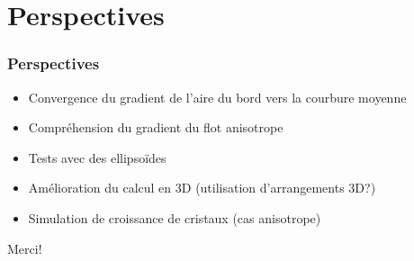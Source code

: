 \documentclass{beamer}
\begin{document}
\section{Perspectives}

\begin{frame}
    \frametitle{Perspectives}

    \begin{itemize}
        \item Convergence du gradient de l'aire du bord vers la courbure
            moyenne
        \item Compréhension du gradient du flot anisotrope
        \item Tests avec des ellipsoïdes
        \item Amélioration du calcul en 3D (utilisation d'arrangements 3D?)
        \item Simulation de croissance de cristaux (cas anisotrope)
    \end{itemize}
\end{frame}

\begin{frame}
    \begin{center}
        \huge{Merci!}
    \end{center}
\end{frame}
\end{document}
